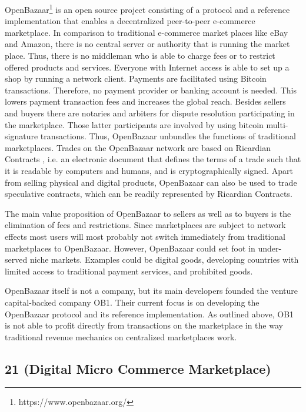 OpenBazaar\footnote{https://www.openbazaar.org/} is an open source project consisting of a protocol and a reference 
implementation that enables a decentralized peer-to-peer e-commerce marketplace. 
In comparison to traditional e-commerce market places like eBay and Amazon, there 
is no central server or authority that is running the market place. Thus, there 
is no middleman who is able to charge fees or to restrict offered products and 
services. Everyone with Internet access is able to set up a shop by running a network 
client. Payments are facilitated using Bitcoin transactions. Therefore, no payment 
provider or banking account is needed. This lowers payment transaction fees and 
increases the global reach. Besides sellers and buyers there are notaries and arbiters 
for dispute resolution participating in the marketplace. Those latter participants 
are involved by using bitcoin multi-signature transactions. Thus, OpenBazaar unbundles 
the functions of traditional marketplaces. Trades on the OpenBazaar network are 
based on Ricardian Contracts \parencite{1319505}, i.e. an electronic document that defines 
the terms of a trade such that it is readable by computers and humans, and is cryptographically 
signed. Apart from selling physical and digital products, OpenBazaar can also be 
used to trade speculative contracts, which can be readily represented by Ricardian 
Contracts. 

The main value proposition of OpenBazaar to sellers as well as to buyers is the 
elimination of fees and restrictions. Since marketplaces are subject to network 
effects most users will most probably not switch immediately from traditional marketplaces 
to OpenBazaar. However, OpenBazaar could set foot in under-served niche markets. 
Examples could be digital goods, developing countries with limited access to traditional 
payment services, and prohibited goods. 

OpenBazaar itself is not a company, but its main developers founded the venture 
capital-backed company OB1. Their current focus is on developing the OpenBazaar 
protocol and its reference implementation. As outlined above, OB1 is not able to 
profit directly from transactions on the marketplace in the way traditional revenue 
mechanics on centralized marketplaces work. 

\subsection{21 (Digital Micro Commerce Marketplace)}
\label{sec:eco21}

